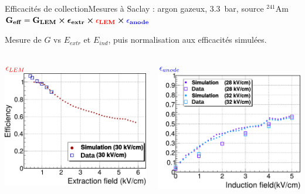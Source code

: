     \begin{frame}{Efficacités de collection}{Mesures à Saclay : argon gazeux, \SI{3.3}{\bar}, source $^{241}$Am}
        $\mathbf{G_{eff}=G_{LEM}\boldsymbol{\times}\boldsymbol{\epsilon}_{extr} \boldsymbol{\times}\textcolor{red}{\epsilon_{LEM}}\boldsymbol{\times} \textcolor{blue}{\epsilon_{anode}}}$\\\vspace{0.2cm}
        
        \begin{scriptsize}
         Mesure de $G$ vs $E_{extr}$ et $E_{ind}$, puis normalisation aux efficacités simulées.\\\vfill
        \begin{columns}
            \begin{column}{0.5\textwidth}
                \centering $\textcolor{red}{\epsilon_{LEM}}$
                \includegraphics[width=\textwidth]{./pictures/eff_lem_gamelle.pdf}
            \end{column}\hfill
            \begin{column}{0.5\textwidth}
                \centering $\textcolor{blue}{\epsilon_{anode}}$
                \includegraphics[width=\textwidth]{./pictures/eff_anode_gamelle.pdf}

\end{column}
\end{columns}
\end{scriptsize}
\end{frame}
